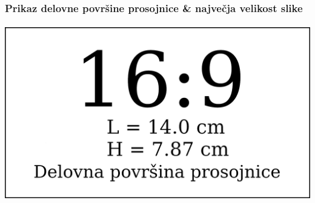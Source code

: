 \documentclass[8pt,aspectratio=169]{beamer} %
\begin{document}

\begin{frame}
	\frametitle{Prikaz delovne površine prosojnice \& največja velikost slike}
	
	
	\begin{center}
		\includegraphics[height=7.7cm]{figs/169_frame.png} %
	\end{center}	
	
\end{frame}

\end{document}

